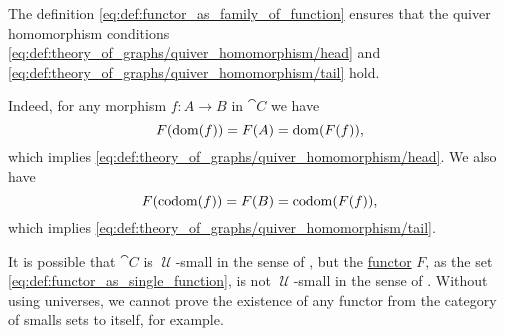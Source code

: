 \begin{defproof}
  The definition \eqref{eq:def:functor_as_family_of_function} ensures that the quiver homomorphism conditions \eqref{eq:def:theory_of_graphs/quiver_homomorphism/head} and \eqref{eq:def:theory_of_graphs/quiver_homomorphism/tail} hold.

  Indeed, for any morphism \( f: A \to B \) in \( \cat{C} \) we have
  \begin{equation*}
    F(\operatorname{dom}(f)) = F(A) = \operatorname{dom}(F(f)),
  \end{equation*}
  which implies \eqref{eq:def:theory_of_graphs/quiver_homomorphism/head}. We also have
  \begin{equation*}
    F(\operatorname*{co\negthinspace\operatorname{dom}}(f)) = F(B) = \operatorname*{co\negthinspace\operatorname{dom}}(F(f)),
  \end{equation*}
  which implies \eqref{eq:def:theory_of_graphs/quiver_homomorphism/tail}.
\end{defproof}

\begin{remark}\label{rem:functor_size}
  It is possible that \( \cat{C} \) is \( \mscrU \)-small in the sense of , but the \hyperref[def:functor]{functor} \( F \), as the set \eqref{eq:def:functor_as_single_function}, is not \( \mscrU \)-small in the sense of . Without using universes, we cannot prove the existence of any functor from the category of smalls sets to itself, for example.
\end{remark}

